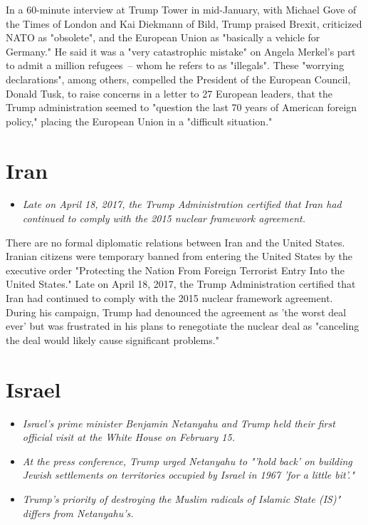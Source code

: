 In a 60-minute interview at Trump Tower in mid-January, with Michael
Gove of the Times of London and Kai Diekmann of Bild, Trump praised
Brexit, criticized NATO as "obsolete", and the European Union as
"basically a vehicle for Germany." He said it was a "very catastrophic
mistake" on Angela Merkel's part to admit a million refugees~-- whom he
refers to as "illegals". These "worrying declarations", among others,
compelled the President of the European Council, Donald Tusk, to raise
concerns in a letter to 27 European leaders, that the Trump
administration seemed to "question the last 70 years of American foreign
policy," placing the European Union in a "difficult situation."

\section{Iran}\label{iran}

\begin{itemize}
\item
  \emph{Late on April 18, 2017, the Trump Administration certified that
  Iran had continued to comply with the 2015 nuclear framework
  agreement.}
\end{itemize}

There are no formal diplomatic relations between Iran and the United
States. Iranian citizens were temporary banned from entering the United
States by the executive order "Protecting the Nation From Foreign
Terrorist Entry Into the United States." Late on April 18, 2017, the
Trump Administration certified that Iran had continued to comply with
the 2015 nuclear framework agreement. During his campaign, Trump had
denounced the agreement as 'the worst deal ever' but was frustrated in
his plans to renegotiate the nuclear deal as "canceling the deal would
likely cause significant problems."

\section{Israel}\label{israel}

\begin{itemize}
\item
  \emph{Israel's prime minister Benjamin Netanyahu and Trump held their
  first official visit at the White House on February 15.}
\item
  \emph{At the press conference, Trump urged Netanyahu to "'hold back'
  on building Jewish settlements on territories occupied by Israel in
  1967 'for a little bit'."}
\item
  \emph{Trump's priority of destroying the Muslim radicals of Islamic
  State (IS)" differs from Netanyahu's.}
\end{itemize}

